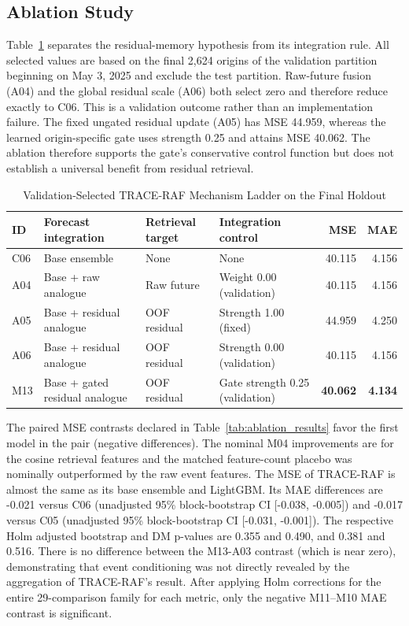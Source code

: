 \documentclass{ieeeaccess}
\begin{document}
\subsection{Ablation Study}
Table~\ref{tab:trace_mechanism} separates the residual-memory hypothesis from its integration rule. All selected values are based on the final 2,624 origins of the validation partition beginning on May 3, 2025 and exclude the test partition. Raw-future fusion (A04) and the global residual scale (A06) both select zero and therefore reduce exactly to C06. This is a validation outcome rather than an implementation failure. The fixed ungated residual update (A05) has MSE 44.959, whereas the learned origin-specific gate uses strength 0.25 and attains MSE 40.062. The ablation therefore supports the gate's conservative control function but does not establish a universal benefit from residual retrieval.

\begin{table}[!t]
\centering
\caption{Validation-Selected TRACE-RAF Mechanism Ladder on the Final Holdout}
\label{tab:trace_mechanism}
\begin{tabular}{llllrr}
\toprule
ID & Forecast integration & Retrieval target & Integration control & MSE & MAE \\
\midrule
C06 & Base ensemble & None & None & 40.115 & 4.156 \\
A04 & Base + raw analogue & Raw future & Weight 0.00 (validation) & 40.115 & 4.156 \\
A05 & Base + residual analogue & OOF residual & Strength 1.00 (fixed) & 44.959 & 4.250 \\
A06 & Base + residual analogue & OOF residual & Strength 0.00 (validation) & 40.115 & 4.156 \\
M13 & Base + gated residual analogue & OOF residual & Gate strength 0.25 (validation) & \textbf{40.062} & \textbf{4.134} \\
\bottomrule
\end{tabular}
\end{table}

The paired MSE contrasts declared in Table~\ref{tab:ablation_results} favor the first model in the pair (negative differences). The nominal M04 improvements are for the cosine retrieval features and the matched feature-count placebo was nominally outperformed by the raw event features. The MSE of TRACE-RAF is almost the same as its base ensemble and LightGBM. Its MAE differences are -0.021 versus C06 (unadjusted 95\% block-bootstrap CI [-0.038, -0.005]) and -0.017 versus C05 (unadjusted 95\% block-bootstrap CI [-0.031, -0.001]). The respective Holm adjusted bootstrap and DM p-values are 0.355 and 0.490, and 0.381 and 0.516. There is no difference between the M13-A03 contrast (which is near zero), demonstrating that event conditioning was not directly revealed by the aggregation of TRACE-RAF's result. After applying Holm corrections for the entire 29-comparison family for each metric, only the negative M11--M10 MAE contrast is significant.
\end{document}
